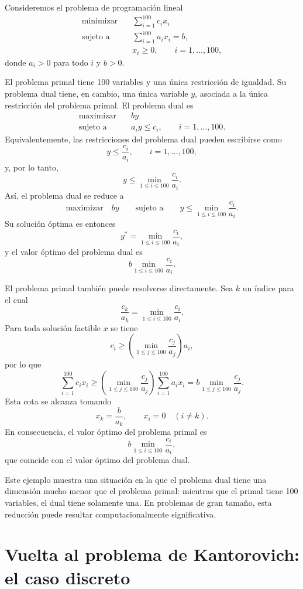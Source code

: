\documentclass[12pt, a4paper]{amsbook}
\theoremstyle{remark}
\theoremstyle{definition}
\numberwithin{section}{chapter}
\numberwithin{subsection}{section}
\numberwithin{equation}{section}
\numberwithin{figure}{chapter}
\begin{document}
Consideremos el problema de programación lineal
\[
\begin{aligned}
\text{minimizar}\quad &
\sum_{i=1}^{100} c_i x_i\\
\text{sujeto a}\quad &
\sum_{i=1}^{100} a_i x_i=b,\\
&x_i\geq0,\qquad i=1,\ldots,100,
\end{aligned}
\]
donde $a_i>0$ para todo $i$ y $b>0$.

El problema primal tiene 100 variables y una única restricción de igualdad.
Su problema dual tiene, en cambio, una única variable $y$, asociada a la
única restricción del problema primal. El problema dual es
\[
\begin{aligned}
\text{maximizar}\quad &
by\\
\text{sujeto a}\quad &
a_i y\leq c_i,\qquad i=1,\ldots,100.
\end{aligned}
\]
Equivalentemente, las restricciones del problema dual pueden escribirse como
\[
y\leq\frac{c_i}{a_i},
\qquad i=1,\ldots,100,
\]
y, por lo tanto,
\[
y\leq\min_{1\leq i\leq100}\frac{c_i}{a_i}.
\]
Así, el problema dual se reduce a
\[
\text{maximizar}\quad by
\qquad\text{sujeto a}\qquad
y\leq\min_{1\leq i\leq100}\frac{c_i}{a_i}.
\]
Su solución óptima es entonces
\[
y^*=\min_{1\leq i\leq100}\frac{c_i}{a_i},
\]
y el valor óptimo del problema dual es
\[
b\min_{1\leq i\leq100}\frac{c_i}{a_i}.
\]

El problema primal también puede resolverse directamente. Sea $k$ un índice
para el cual
\[
\frac{c_k}{a_k}
=
\min_{1\leq i\leq100}\frac{c_i}{a_i}.
\]
Para toda solución factible $x$ se tiene
\[
c_i\geq
\left(\min_{1\leq j\leq100}\frac{c_j}{a_j}\right)a_i,
\]
por lo que
\[
\sum_{i=1}^{100}c_i x_i
\geq
\left(\min_{1\leq j\leq100}\frac{c_j}{a_j}\right)
\sum_{i=1}^{100}a_i x_i
=
b\min_{1\leq j\leq100}\frac{c_j}{a_j}.
\]
Esta cota se alcanza tomando
\[
x_k=\frac{b}{a_k},
\qquad
x_i=0\quad(i\neq k).
\]
En consecuencia, el valor óptimo del problema primal es
\[
b\min_{1\leq i\leq100}\frac{c_i}{a_i},
\]
que coincide con el valor óptimo del problema dual.

Este ejemplo muestra una situación en la que el problema dual tiene una
dimensión mucho menor que el problema primal: mientras que el primal tiene
100 variables, el dual tiene solamente una. En problemas de gran tamaño,
esta reducción puede resultar computacionalmente significativa.

\section{Vuelta al problema de Kantorovich: el caso discreto}\label{kant.discreto}
\end{document}
